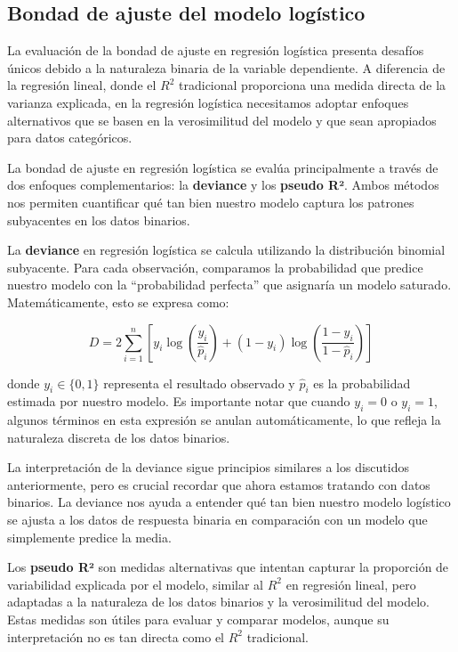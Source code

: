 \documentclass[
  letterpaper,
  DIV=11,
  numbers=noendperiod]{scrreprt}
\begin{document}
\subsection{Bondad de ajuste del modelo
logístico}\label{bondad-de-ajuste-del-modelo-loguxedstico}

La evaluación de la bondad de ajuste en regresión logística presenta
desafíos únicos debido a la naturaleza binaria de la variable
dependiente. A diferencia de la regresión lineal, donde el \(R^2\)
tradicional proporciona una medida directa de la varianza explicada, en
la regresión logística necesitamos adoptar enfoques alternativos que se
basen en la verosimilitud del modelo y que sean apropiados para datos
categóricos.

La bondad de ajuste en regresión logística se evalúa principalmente a
través de dos enfoques complementarios: la \textbf{deviance} y los
\textbf{pseudo R²}. Ambos métodos nos permiten cuantificar qué tan bien
nuestro modelo captura los patrones subyacentes en los datos binarios.

La \textbf{deviance} en regresión logística se calcula utilizando la
distribución binomial subyacente. Para cada observación, comparamos la
probabilidad que predice nuestro modelo con la ``probabilidad perfecta''
que asignaría un modelo saturado. Matemáticamente, esto se expresa como:

\[D = 2 \sum_{i=1}^{n} \left[ y_i \log\left(\frac{y_i}{\hat{p}_i}\right) + (1-y_i) \log\left(\frac{1-y_i}{1-\hat{p}_i}\right) \right]\]

donde \(y_i \in \{0,1\}\) representa el resultado observado y
\(\hat{p}_i\) es la probabilidad estimada por nuestro modelo. Es
importante notar que cuando \(y_i = 0\) o \(y_i = 1\), algunos términos
en esta expresión se anulan automáticamente, lo que refleja la
naturaleza discreta de los datos binarios.

La interpretación de la deviance sigue principios similares a los
discutidos anteriormente, pero es crucial recordar que ahora estamos
tratando con datos binarios. La deviance nos ayuda a entender qué tan
bien nuestro modelo logístico se ajusta a los datos de respuesta binaria
en comparación con un modelo que simplemente predice la media.

Los \textbf{pseudo R²} son medidas alternativas que intentan capturar la
proporción de variabilidad explicada por el modelo, similar al \(R^2\)
en regresión lineal, pero adaptadas a la naturaleza de los datos
binarios y la verosimilitud del modelo. Estas medidas son útiles para
evaluar y comparar modelos, aunque su interpretación no es tan directa
como el \(R^2\) tradicional.
\end{document}
